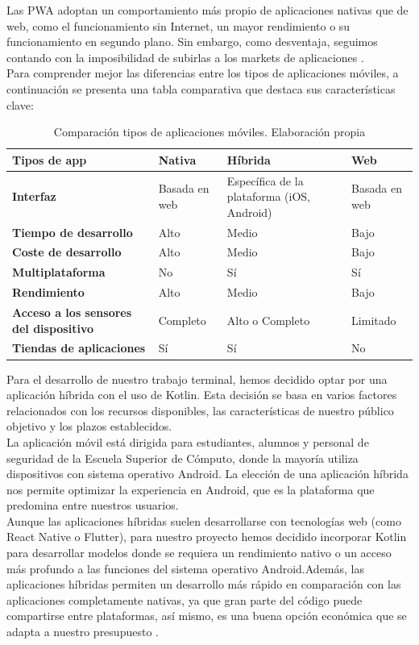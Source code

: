Las PWA adoptan un comportamiento más propio de aplicaciones nativas que de web, como el funcionamiento sin Internet, un mayor rendimiento o su funcionamiento en segundo plano. Sin embargo, como desventaja, seguimos contando con la imposibilidad de subirlas a los markets de aplicaciones \cite{IM1}. \\

Para comprender mejor las diferencias entre los tipos de aplicaciones móviles, a continuación se presenta una tabla comparativa que destaca sus características clave:
\newpage

\begin{table}[h!]
	\centering
	\begin{tabular}{|p{4cm}|p{2cm}|p{2cm}|p{2cm}|}
		\hline
		\textbf{Tipos de app} & \textbf{Nativa} & \textbf{Híbrida} & \textbf{Web} \\ \hline
		\textbf{Interfaz} & Basada en web & Específica de la plataforma (iOS, Android) & Basada en web \\ \hline
		\textbf{Tiempo de desarrollo} & Alto & Medio & Bajo \\ \hline
		\textbf{Coste de desarrollo} & Alto & Medio & Bajo \\ \hline
		\textbf{Multiplataforma} & No & Sí & Sí \\ \hline
		\textbf{Rendimiento} & Alto & Medio & Bajo \\ \hline
		\textbf{Acceso a los sensores del dispositivo} & Completo & Alto o Completo & Limitado \\ \hline
		\textbf{Tiendas de aplicaciones} & Sí & Sí & No \\ \hline
	\end{tabular}
	\caption{Comparación tipos de aplicaciones móviles. Elaboración propia}
	\label{tab:tipos_apps}
\end{table}

Para el desarrollo de nuestro trabajo terminal, hemos decidido optar por una aplicación híbrida con el uso de Kotlin. Esta decisión se basa en varios factores relacionados con los recursos disponibles, las características de nuestro público objetivo y los plazos establecidos. \\

La aplicación móvil está dirigida para estudiantes, alumnos y personal de seguridad de la Escuela Superior de Cómputo, donde la mayoría utiliza dispositivos con sistema operativo Android. La elección de una aplicación híbrida nos permite optimizar  la experiencia en Android, que es la plataforma que predomina entre nuestros usuarios. \\

Aunque las aplicaciones híbridas suelen desarrollarse con tecnologías web (como React Native o Flutter), para nuestro proyecto hemos decidido incorporar Kotlin para desarrollar modelos donde se requiera un rendimiento nativo o un acceso más profundo a las funciones del sistema operativo Android.Además, las aplicaciones híbridas permiten un desarrollo más rápido en comparación con las aplicaciones completamente nativas, ya que gran parte del código puede compartirse entre plataformas, así mismo, es una buena opción económica que se adapta a nuestro presupuesto \cite{IM1}. 